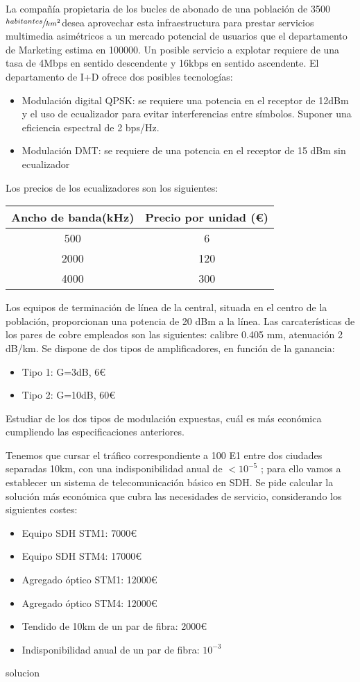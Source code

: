 \begin{exercise}[3]
La compañía propietaria de los bucles de abonado de una población de 3500$\sfrac{habitantes}{km^2}$desea aprovechar esta infraestructura para prestar servicios multimedia asimétricos a un mercado potencial de usuarios que el departamento de Marketing estima en 100000. Un posible servicio a explotar requiere de una tasa de 4Mbps en sentido descendente y 16kbps en sentido ascendente. El departamento de I+D ofrece dos posibles tecnologías:
\begin{itemize}
	\item Modulación digital QPSK: se requiere una potencia en el receptor de 12dBm y el uso de ecualizador para evitar interferencias entre símbolos. Suponer una eficiencia espectral de 2 bps/Hz.
	\item Modulación DMT: se requiere de una potencia en el receptor de 15 dBm sin ecualizador
\end{itemize}
Los precios de los ecualizadores son los siguientes:
\begin{center}
\begin{tabular}{|c c|}
\hline
	Ancho de banda(kHz) & Precio por unidad (€)\\\hline
	500 & 6\\\hline
	2000 & 120\\\hline
	4000 & 300\\\hline
\end{tabular}
\end{center}
Los equipos de terminación de línea de la central, situada en el centro de la población, proporcionan una potencia de 20 dBm a la línea. Las carcaterísticas de los pares de cobre empleados son las siguientes: calibre 0.405 mm, atenuación 2 dB/km. Se dispone de dos tipos de amplificadores, en función de la ganancia:
\begin{itemize}
	\item Tipo 1: G=3dB, 6€
	\item Tipo 2: G=10dB, 60€
\end{itemize}
Estudiar de los dos tipos de modulación expuestas, cuál es más económica cumpliendo las especificaciones anteriores.
\end{exercise}
\begin{exercise}[4]
	Tenemos que cursar el tráfico correspondiente a 100 E1 entre dos ciudades separadas 10km, con una indisponibilidad anual de $<10^{-5}$ ; para ello vamos a establecer un sistema de telecomunicación básico en SDH. Se pide calcular la solución más económica que cubra las necesidades de servicio, considerando los siguientes costes:
\begin{itemize}
	\item Equipo SDH STM1: 7000€
	\item Equipo SDH STM4: 17000€
	\item Agregado óptico STM1: 12000€
	\item Agregado óptico STM4: 12000€
	\item Tendido de 10km de un par de fibra: 2000€
	\item Indisponibilidad anual de un par de fibra: $10^{-3}$
\end{itemize}
solucion
\end{exercise}
